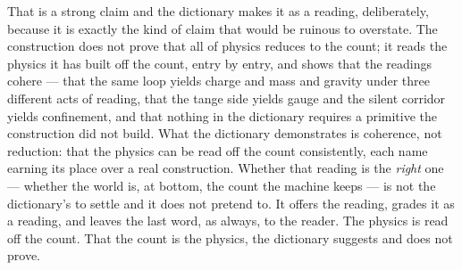 That is a strong claim and the dictionary makes it as a reading, deliberately, because it is exactly the kind of
claim that would be ruinous to overstate. The construction does not prove that all of physics reduces to the count; it
reads the physics it has built off the count, entry by entry, and shows that the readings cohere --- that the same
loop yields charge and mass and gravity under three different acts of reading, that the tange side yields gauge
and the silent corridor yields confinement, and that nothing in the dictionary requires a primitive the
construction did not build. What the dictionary demonstrates is coherence, not reduction: that the physics can be
read off the count consistently, each name earning its place over a real construction. Whether that reading is the
\emph{right} one --- whether the world is, at bottom, the count the machine keeps --- is not the dictionary's to
settle and it does not pretend to. It offers the reading, grades it as a reading, and leaves the last word, as
always, to the reader. The physics is read off the count. That the count is the physics, the
dictionary suggests and does not prove.
